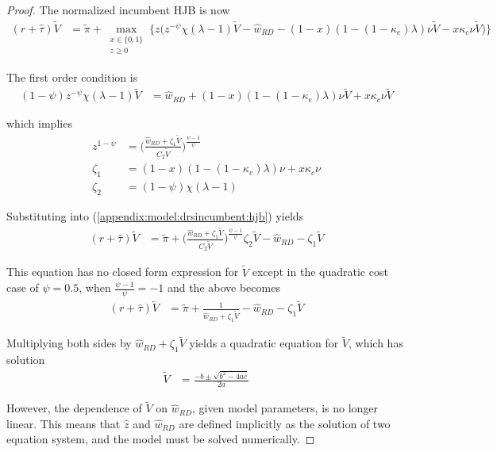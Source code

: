 \documentclass[11pt,english]{article}
\begin{document}
\begin{proof}
	The normalized incumbent HJB is now
	\begin{align}
	(r + \hat{\tau}) \tilde{V} &= \tilde{\pi} + \max_{\substack{x \in \{0,1\} \\ z \ge 0}} \Big\{  z \Big( z^{-\psi} \chi (\lambda - 1) \tilde{V} - \hat{w}_{RD} - (1-x)(1 - (1-\kappa_e) \lambda)\nu \tilde{V} - x \kappa_c \nu \tilde{V}  \Big)   \Big\} \label{appendix:model:drsincumbent:hjb}
	\end{align} 
	
	The first order condition is
	\begin{align}
	(1-\psi) z^{-\psi} \chi (\lambda -1)\tilde{V} &= \hat{w}_{RD} + (1-x) (1-(1-\kappa_e)\lambda)\nu \tilde{V} + x \kappa_c \nu \tilde{V}
	\end{align}
	
	which implies
	\begin{align}
	z^{1-\psi} &= \Big( \frac{\hat{w}_{RD} + \zeta_1\tilde{V}}{C_2\tilde{V}} \Big)^{\frac{\psi -1}{\psi}} \\
	\zeta_1 &= (1-x)(1-(1-\kappa_e)\lambda)\nu + x\kappa_c\nu \\
	\zeta_2 &= (1-\psi) \chi (\lambda-1)
	\end{align}
	
	Substituting into (\ref{appendix:model:drsincumbent:hjb}) yields
	\begin{align}
	(r + \hat{\tau}) \tilde{V} &= \tilde{\pi} + \Big( \frac{\hat{w}_{RD} + \zeta_1\tilde{V}}{C_2\tilde{V}} \Big)^{\frac{\psi -1}{\psi}} \zeta_2 \tilde{V} - \hat{w}_{RD} - \zeta_1 \tilde{V} 
	\end{align}
	
	This equation has no closed form expression for $\tilde{V}$ except in the quadratic cost case of $\psi = 0.5$, when $\frac{\psi - 1}{\psi} = -1$ and the above becomes
	\begin{align}
	(r + \hat{\tau}) \tilde{V} &= \tilde{\pi} +  \frac{1}{\hat{w}_{RD} + \zeta_1\tilde{V}} - \hat{w}_{RD} - \zeta_1 \tilde{V} 
	\end{align}
	
	Multiplying both sides by $\hat{w}_{RD} + \zeta_1 \tilde{V}$ yields a quadratic equation for $\tilde{V}$, which has solution
	\begin{align}
		\tilde{V} &= \frac{-b \pm \sqrt{b^2 - 4ac}}{2a}
	\end{align}
	
	However, the dependence of $\tilde{V}$ on $\hat{w}_{RD}$, given model parameters, is no longer linear. This means that $\hat{z}$ and $\hat{w}_{RD}$ are defined implicitly as the solution of two equation system, and the model must be solved numerically.	
\end{proof}
\end{document}
